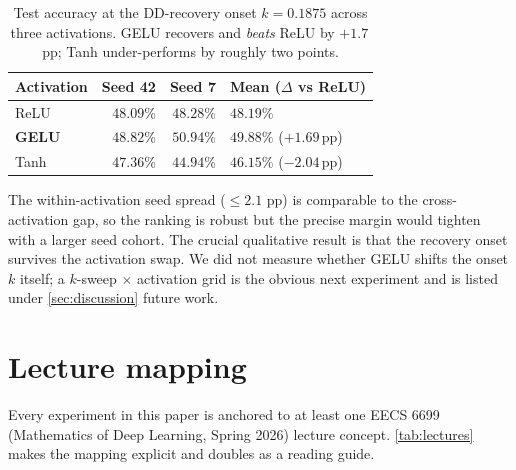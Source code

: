 \begin{table}[t]
  \centering
  \small
  \caption{Test accuracy at the DD-recovery onset $k\!=\!0.1875$ across three activations. GELU recovers and \emph{beats} ReLU by $+1.7$\,pp; Tanh under-performs by roughly two points.}
  \label{tab:activation}
  \begin{tabular}{@{}lrrl@{}}
    \toprule
    Activation & Seed 42 & Seed 7 & Mean ($\Delta$ vs ReLU) \\
    \midrule
    ReLU       & $48.09\%$ & $48.28\%$ & $48.19\%$ \\
    \textbf{GELU} & $48.82\%$ & $50.94\%$ & $\mathbf{49.88\%}$ ($+1.69$\,pp) \\
    Tanh       & $47.36\%$ & $44.94\%$ & $46.15\%$ ($-2.04$\,pp) \\
    \bottomrule
  \end{tabular}
\end{table}

The within-activation seed spread ($\le 2.1$ pp) is comparable to the cross-activation gap, so the ranking is robust but the precise margin would tighten with a larger seed cohort. The crucial qualitative result is that the recovery onset survives the activation swap. We did not measure whether GELU shifts the onset $k$ itself; a $k$-sweep $\times$ activation grid is the obvious next experiment and is listed under \cref{sec:discussion} future work.

\section{Lecture mapping}
\label{app:lectures}

Every experiment in this paper is anchored to at least one EECS 6699 (Mathematics of Deep Learning, Spring 2026) lecture concept. \cref{tab:lectures} makes the mapping explicit and doubles as a reading guide.

